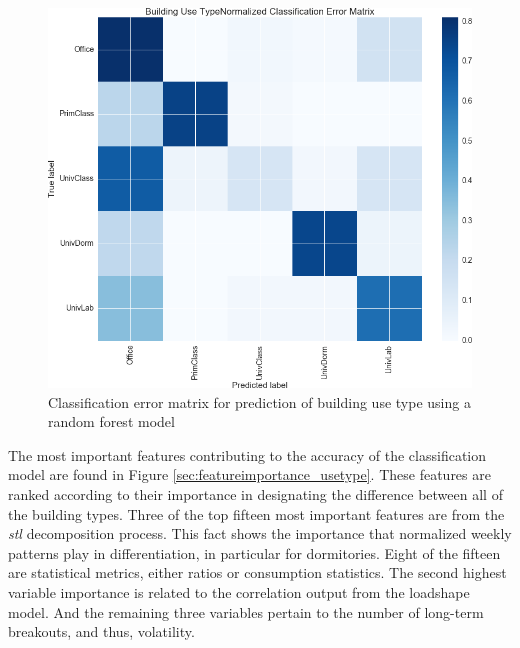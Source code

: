 \begin{figure}[ht!]
\begin{center}
\includegraphics[width=1\columnwidth]{figures/ConfusionMatrixBuildingUseType/ConfusionMatrixBuildingUseType}
\caption{{Classification error matrix for prediction of building use type using a random forest model
\label{fig:use_classification}%
}}
\end{center}
\end{figure}

The most important features contributing to the accuracy of the classification model are found in Figure \ref{sec:featureimportance_usetype}. These features are ranked according to their importance in designating the difference between all of the building types. Three of the top fifteen most important features are from the \emph{stl} decomposition process. This fact shows the importance that normalized weekly patterns play in differentiation, in particular for dormitories. Eight of the fifteen are statistical metrics, either ratios or consumption statistics. The second highest variable importance is related to the correlation output from the loadshape model. And the remaining three variables pertain to the number of long-term breakouts, and thus, volatility.

